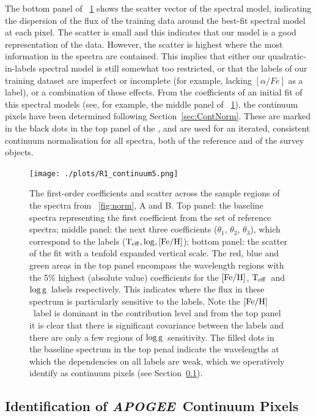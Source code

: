 \documentclass[12pt, preprint]{aastex}
\newcommand{\sectionname}{Section}
\newcommand{\apogee}{\textsl{APOGEE}}
\newcommand{\teff}{\mbox{$\rm T_{eff}$}}
\newcommand{\feh}{\mbox{$\rm [Fe/H]$}}
\newcommand{\logg}{\mbox{$\rm \log g$}}
\begin{document}
The bottom panel of \figurename~\ref{fig:coeffs} shows the scatter vector of the spectral model, 
indicating the dispersion of the flux of the training data around the best-fit spectral model at each pixel. 
The scatter is small and this indicates that our model is a good representation of the data. 
However, the scatter is highest where the most information in the spectra are contained. 
This implies that either our quadratic-in-labels spectral model is still somewhat too restricted, or that the labels of our training dataset are imperfect or incomplete 
(for example, lacking $[\alpha / Fe]$ as a label), or a combination of these effects. 
From the coefficients of an initial fit of this spectral models (see, for example, the middle panel of \figurename~\ref{fig:coeffs}), 
the continuum pixels have been determined following \sectionname~\ref{sec:ContNorm}. 
These are marked in the black dots in the top panel of the \figurename, and are used for an iterated, 
consistent continuum normalisation for all spectra, both of the reference and of the survey objects.

\begin{figure}[h!]
\centering
    \texttt{[image: ./plots/R1\_continuum5.png]}
  \caption{The first-order coefficients and scatter across the sample regions of the spectra from \figurename~\ref{fig:norm}, A and B. Top panel: the baseline spectra representing the first coefficient from the set of reference spectra; middle panel: the next three coefficients ($\theta_1$, $\theta_2$, $\theta_3$),  which correspond to the labels ($\teff, \log, \feh$); bottom panel: the scatter of the fit with a tenfold expanded vertical scale.  The red, blue and green areas in the top panel encompass the wavelength regions with the 5\% highest (absolute value) coefficients for the \feh, \teff\ and \logg\ labels respectively. This indicates where the flux in these spectrum is particularly sensitive to the labels.  Note the \feh\ label is dominant in the contribution level and from the top panel it is clear that there is significant covariance between the labels and there are only a few regions of \logg\ sensitivity. The filled dots in the baseline spectrum in the top penal indicate the wavelengths at which the dependencies on all labels are weak, which we operatively identify as continuum pixels (see \sectionname~\ref{sec:ApogeeContinuum}).}
\label{fig:coeffs}
\end{figure}

\subsection{Identification of \apogee\ Continuum Pixels}
\label{sec:ApogeeContinuum}
\end{document}
